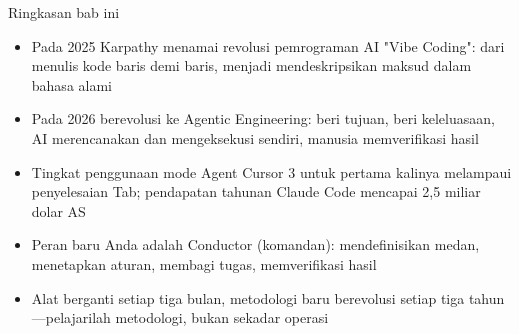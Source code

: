 \begin{tcbsummary}{Ringkasan bab ini}
\begin{itemize}
  \item Pada 2025 Karpathy menamai revolusi pemrograman AI "Vibe Coding": dari menulis kode baris demi baris, menjadi mendeskripsikan maksud dalam bahasa alami
  \item Pada 2026 berevolusi ke Agentic Engineering: beri tujuan, beri keleluasaan, AI merencanakan dan mengeksekusi sendiri, manusia memverifikasi hasil
  \item Tingkat penggunaan mode Agent Cursor 3 untuk pertama kalinya melampaui penyelesaian Tab; pendapatan tahunan Claude Code mencapai 2,5 miliar dolar AS
  \item Peran baru Anda adalah Conductor (komandan): mendefinisikan medan, menetapkan aturan, membagi tugas, memverifikasi hasil
  \item Alat berganti setiap tiga bulan, metodologi baru berevolusi setiap tiga tahun—pelajarilah metodologi, bukan sekadar operasi
\end{itemize}

\end{tcbsummary}
